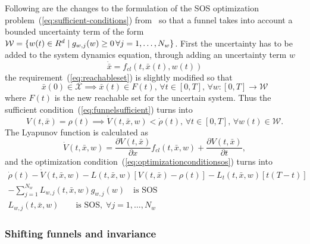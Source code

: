 Following are the changes to the formulation of the \ac{SOS} optimization
problem~(\ref{eq:sufficient-conditions})
from~\cite{majumdarFunnelLibrariesRealtime2017} so that a funnel takes into
account a bounded uncertainty term of the form \(\mathcal{W} = \lbrace w(t) \in
  R^d \mid g_{w,j}(w) \geq 0\, \forall j = 1,\ldots,N_w\rbrace\). First the uncertainty
has to be added to the system dynamics equation, through adding an uncertainty
term \(w\)
\begin{equation}
  \dot{\bar{x}} = f_{cl}(t, \bar{x}(t), w(t))
\end{equation}
the requirement~(\ref{eq:reachableset}) is slightly modified so that
\begin{equation}
  \label{eq:uncertain-reachableset}
  \bar{x}(0) \in \mathcal{X} \implies \bar{x}(t) \in F(t),\, \forall t \in
  [0,T], \, \forall w \colon [0,T] \rightarrow \mathcal{W}
\end{equation} 
where \(F(t)\) is the new reachable set for the uncertain system. Thus the
sufficient condition~(\ref{eq:funnelsufficient}) turns into
\begin{equation}
  \label{eq:funneluncertain-sufficient}
  V(t,\bar{x}) = \rho(t) \implies \dot{V}(t,\bar{x},w) < \dot{\rho}(t), \, \forall t \in [0,T], \, \forall w(t) \in \mathcal{W}.
\end{equation}
The Lyapunov function is calculated as
\begin{equation}
  \dot{V}(t,\bar{x}, w) = \frac{\partial V(t,\bar{x})}{\partial x} f_{cl}(t,\bar{x},w) + \frac{\partial V(t,\bar{x})}{\partial t},
\end{equation}
and the optimization condition~(\ref{eq:optimizationconditionsos}) turns into
\begin{align}
  \label{eq:optimizationconditionuncertain}
  \dot{\rho}(t) - \dot{V}(t,\bar{x},w) - L(t,\bar{x},w) \left[ V(t,\bar{x}) - \rho(t) \right] - L_{t}(t,\bar{x},w)\left[ t\left( T - t \right) \right]  & \nonumber \\
  - \sum_{j=1}^{N_{w}} L_{w,j}(t,\bar{x},w)g_{w,j}(w) \quad \text{is SOS} &  \\
  L_{w,j}(t,\bar{x},w) \qquad \text{is SOS}, \; \forall j = 1,\ldots,N_w \nonumber
\end{align}

\subsubsection{Shifting funnels and invariance}


